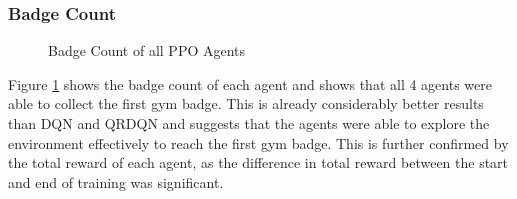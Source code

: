 \subsubsection*{Badge Count}
\begin{figure}[H]
    \centering
    \caption{Badge Count of all PPO Agents}
    \label{fig:PPO_badge_count}
\end{figure}

Figure \ref{fig:PPO_badge_count} shows the badge count of each agent and shows that all 4 agents were able to collect the first gym badge. This is already considerably better results than DQN and QRDQN and suggests that the agents were able to explore the environment effectively to reach the first gym badge. This is further confirmed by the total reward of each agent, as the difference in total reward between the start and end of training was significant. 

